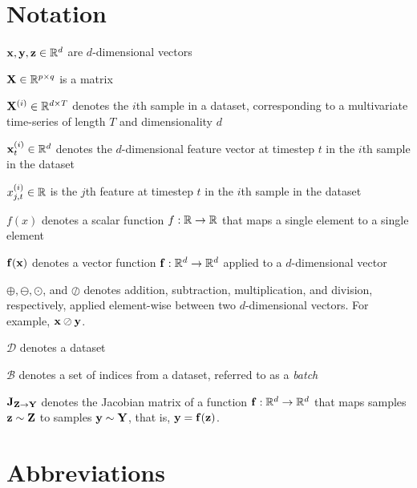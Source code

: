 \documentclass{statsmsc}
\begin{document}
{\chapter*{Notation}\thispagestyle{plain}
    $\mathbf{x}, \mathbf{y}, \mathbf{z}\in\mathbb{R}^d$ are $d$-dimensional vectors

    $\mathbf{X} \in \mathbb{R}^{p \times q}$ is a matrix

    $\mathbf{X}^{(i)} \in \mathbb{R}^{d \times T}$ denotes the $i$th sample in a dataset, corresponding to a multivariate time-series of length $T$ and dimensionality $d$

    $\mathbf{x}^{(i)}_t \in \mathbb{R}^d$ denotes the $d$-dimensional feature vector at timestep $t$ in the $i$th sample in the dataset

    $x^{(i)}_{j,t}\in\mathbb{R}$ is the $j$th feature at timestep $t$ in the $i$th sample in the dataset

    $f(x)$ denotes a scalar function $f: \mathbb{R} \rightarrow {\mathbb{R}}$ that maps a single element to a single element

    $\mathbf{f}(\mathbf{x})$ denotes a vector function $\mathbf{f}:\mathbb{R}^d \rightarrow {\mathbb{R}^d}$ applied to a $d$-dimensional vector

    $\oplus, \ominus, \odot$, and $\oslash$ denotes addition, subtraction, multiplication, and division, respectively, applied element-wise between two $d$-dimensional vectors. For example, $\mathbf{x} \oslash \mathbf{y}$.

    $\mathcal{D}$ denotes a dataset

    $\mathcal{B}$ denotes a set of indices from a dataset, referred to as a \textit{batch}

    $\mathbf{J}_{\mathbf{Z} \rightarrow {\mathbf{Y}}}$ denotes the Jacobian matrix of a function $\mathbf{f} : \mathbb{R}^d \rightarrow {\mathbb{R}^d}$ that maps samples $\mathbf{z} \sim \mathbf{Z}$ to samples $\mathbf{y} \sim \mathbf{Y}$, that is,
    $\mathbf{y}=\mathbf{f}(\mathbf{z})$.


{\chapter*{Abbreviations}\thispagestyle{plain}
    \begin{acronym}[TDMA]
    \end{acronym}
}

}
\end{document}
